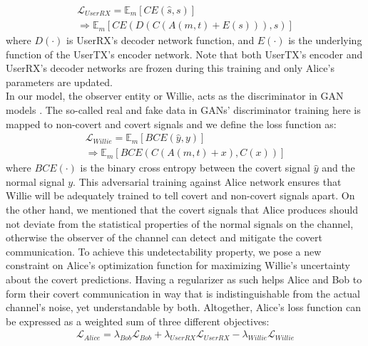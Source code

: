\begin{equation}
	\begin{array}{l} \label{alice_user_loss}
	\mathcal{L}_{UserRX} = \mathbb{E}_{m}[CE(\hat{s}, s)] \\ \Rightarrow \mathbb{E}_{m}[CE(D(C(A(m, t) + E(s))), s)]
	\end{array}
\end{equation}
where \(D(\cdot)\) is UserRX's decoder network function, and \(E(\cdot)\) is the underlying function of the UserTX's encoder network. Note that both UserTX's encoder and UserRX's decoder networks are frozen during this training and only Alice's parameters are updated.\\
In our model, the observer entity or Willie, acts as the discriminator in GAN models \cite{goodfellow2014generative}. The so-called real and fake data in GANs' discriminator training here is mapped to non-covert and covert signals and we define the loss function as:
\begin{equation}
		\begin{array}{l} \label{willie_loss}
	\mathcal{L}_{Willie} = \mathbb{E}_{m}[BCE(\hat{y}, y)] \\ \Rightarrow \mathbb{E}_{m}[BCE(C(A(m,t) + x), C(x))]
	\end{array}
\end{equation}
where \(BCE(\cdot)\) is the binary cross entropy between the covert signal \(\hat{y}\) and the normal signal \(y\). This adversarial training against Alice network ensures that Willie will be adequately trained to tell covert and non-covert signals apart. On the other hand, we mentioned that the covert signals that Alice produces should not deviate from the statistical properties of the normal signals on the channel, otherwise the observer of the channel can detect and mitigate the covert communication. To achieve this undetectability property, we pose a new constraint on Alice's optimization function for maximizing Willie's uncertainty about the covert predictions. Having a regularizer as such helps Alice and Bob to form their covert communication in way that is indistinguishable from the actual channel's noise, yet understandable by both. Altogether, Alice's loss function can be expressed as a weighted sum of three different objectives:
\begin{equation}
	\begin{array}{l} \label{alice_loss}
	\mathcal{L}_{Alice} = \lambda_{Bob} \mathcal{L}_{Bob} + \lambda_{UserRX} \mathcal{L}_{UserRX} - \lambda_{Willie} \mathcal{L}_{Willie}
\end{array}
\end{equation}
